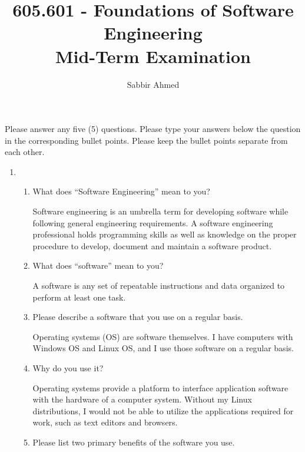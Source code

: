 \documentclass[12pt]{article}
\begin{document}
  \title{605.601 - Foundations of Software Engineering \\ Mid-Term Examination\vspace{-0.5em}}
  \author{Sabbir Ahmed}
  \maketitle
  \vspace{-5em}

  \section*{} Please answer any five (5) questions. Please type your answers below the question in the corresponding bullet points. Please keep the bullet points separate from each other.

  \begin{enumerate}

    \item
    \begin{enumerate}[start=1,align=left]
      \item What does ``Software Engineering'' mean to you?

      Software engineering is an umbrella term for developing software while following general engineering requirements. A software engineering professional holds programming skills as well as knowledge on the proper procedure to develop, document and maintain a software product.

      \item What does ``software'' mean to you?

      A software is any set of repeatable instructions and data organized to perform at least one task.

      \item Please describe a software that you use on a regular basis.

      Operating systems (OS) are software themselves. I have computers with Windows OS and Linux OS, and I use those software on a regular basis.

      \item Why do you use it?

      Operating systems provide a platform to interface application software with the hardware of a computer system. Without my Linux distributions, I would not be able to utilize the applications required for work, such as text editors and browsers.

      \item Please list two primary benefits of the software you use.


\end{enumerate}
\end{enumerate}
\end{document}
